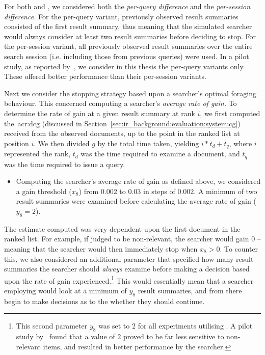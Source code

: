 For both  and , we considered both the \emph{per-query difference} and the \emph{per-session difference.} For the per-query variant, previously observed result summaries consisted of the first result summary, thus meaning that the simulated searcher would always consider at least two result summaries before deciding to stop. For the per-session variant, all previously observed result summaries over the entire search session (i.e. including those from previous queries) were used. In a pilot study, as reported by~\cite{maxwell2015initial_stopping}, we consider in this thesis the per-query variants only. These offered better performance than their per-session variants.

Next we consider the stopping strategy based upon a searcher's optimal foraging behaviour. This concerned computing a searcher's \emph{average rate of gain.} To determine the rate of gain at a given result summary at rank $i$, we first computed the~\gls{acr:dcg} (discussed in Section~\ref{sec:ir_background:evaluation:system:cg}) received from the observed documents, up to the point in the ranked list at position $i$. We then divided $g$ by the total time taken, yielding $i * t_d + t_q$, where $i$ represented the rank, $t_d$ was the time required to examine a document, and $t_q$ was the time required to issue a query.

\begin{itemize}
    \item{ Computing the searcher's average rate of gain as defined above, we considered a gain threshold ($x_8$) from $0.002$ to $0.03$ in steps of $0.002$. A minimum of two result summaries were examined before calculating the average rate of gain ($y_8=2$).}
\end{itemize}

The estimate computed was very dependent upon the first document in the ranked list. For example, if judged to be non-relevant, the searcher would gain $0$ -- meaning that the searcher would then immediately stop when $x_8 > 0$. To counter this, we also considered an additional parameter that specified how many result summaries the searcher should \emph{always} examine before making a decision based upon the rate of gain experienced.\footnote{This second parameter $y_8$ was set to $2$ for all experiments utilising . A pilot study by~\cite{maxwell2015stopping_strategies} found that a value of $2$ proved to be far less sensitive to non-relevant items, and resulted in better performance by the searcher.} This would essentially mean that a searcher employing  would look at a minimum of $y_8$ result summaries, and from there begin to make decisions as to the whether they should continue.

